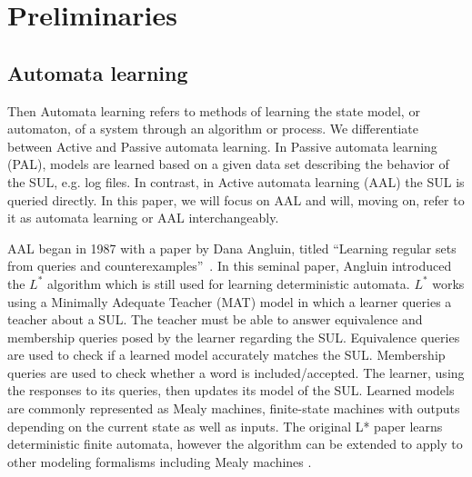 \documentclass[runningheads]{llncs}
\begin{document}
\section{Preliminaries} \label{chap:2} %
\subsection{Automata learning}Then
Automata learning refers to methods of learning the state model, or automaton, of a system through an algorithm or process. We differentiate between Active and Passive automata learning. In Passive automata learning (PAL), models are learned based on a given data set describing the behavior of the SUL, e.g. log files. In contrast, in Active automata learning (AAL) the SUL is queried directly. In this paper, we will focus on AAL and will, moving on, refer to it as automata learning or AAL interchangeably. 

AAL began in 1987 with a paper by Dana Angluin, titled ``Learning regular sets from queries and counterexamples''~\cite{ANGLUIN198787}. In this seminal paper, Angluin introduced the $L^*$ algorithm which is still used for learning deterministic automata. $L^*$ works using a Minimally Adequate Teacher (MAT) model in which a learner queries a teacher about a SUL. The teacher must be able to answer equivalence and membership queries posed by the learner regarding the SUL. Equivalence queries are used to check if a learned model accurately matches the SUL. Membership queries are used to check whether a word is included/accepted. The learner, using the responses to its queries, then updates its model of the SUL. Learned models are commonly represented as Mealy machines, finite-state machines with outputs depending on the current state as well as inputs. The original L* paper learns deterministic finite automata, however the algorithm can be extended to apply to other modeling formalisms including Mealy machines \cite{ShahbazG09}.%
\end{document}
